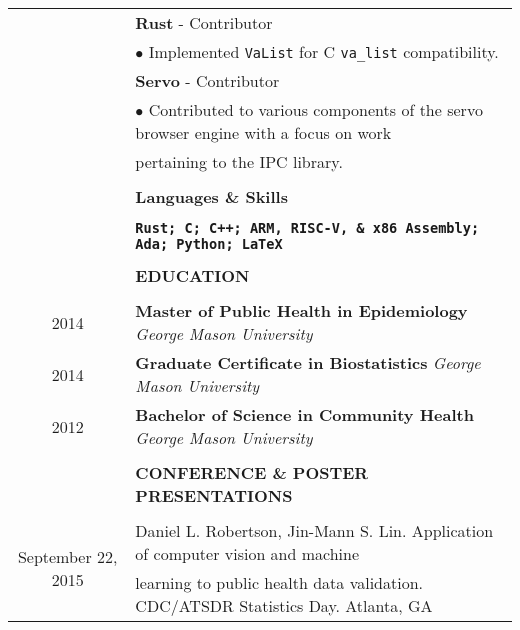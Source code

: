 \documentclass[10pt]{article}
\begin{document}
\begin{table}[ht]
\begin{tabular}{@{\hspace{0mm}}c@{\hspace{1mm}}c@{\hspace{3mm}}cl}
            & & & \textbf{Rust} - Contributor\\
            & & & $\bullet$ Implemented \texttt{VaList} for C \texttt{va\_list} compatibility.\\[2mm]
            & & & \textbf{Servo} - Contributor\\
            & & & $\bullet$ Contributed to various components of the servo browser engine with a focus on work\\
            & & & \hspace*{4mm}pertaining to the IPC library.\\[2mm]
            & & & \color{maroon}{\rule{14cm}{0.75pt}}\\
            & & & \large{\textbf{Languages \& Skills}}\\[-2mm]
            & & & \color{maroon}{\rule{14cm}{0.75pt}}\\
            \multicolumn{3}{c}{} & \textbf{\texttt{Rust; C; C++; ARM, RISC-V, \& x86 Assembly; Ada; Python; \LaTeX}}\\[-1mm]
            & & & \color{maroon}{\rule{14cm}{0.75pt}}\\
            & & & \large{\textbf{EDUCATION}}\\[-2mm]
            & & & \color{maroon}{\rule{14cm}{0.75pt}}\\
            \multicolumn{3}{c}{2014} & \textbf{Master of Public Health in Epidemiology} \textit{George Mason University}\\[1mm]
            \multicolumn{3}{c}{2014} & \textbf{Graduate Certificate in Biostatistics} \textit{George Mason University}\\[1mm]
            \multicolumn{3}{c}{2012} & \textbf{Bachelor of Science in Community Health} \textit{George Mason University}\\[-1mm]
            & & & \color{maroon}{\rule{14cm}{0.75pt}}\\
            & & & \large{\textbf{CONFERENCE \& POSTER PRESENTATIONS}}\\[-2mm]
            & & & \color{maroon}{\rule{14cm}{0.75pt}}\\
            \multicolumn{3}{c}{\multirow{2}{*}{September 22, 2015}} & Daniel L. Robertson, Jin-Mann S. Lin. Application of computer vision and machine\\
            & & & learning to public health data validation. CDC/ATSDR Statistics Day. Atlanta, GA\\[2mm]

\end{tabular}
\end{table}
\end{document}
